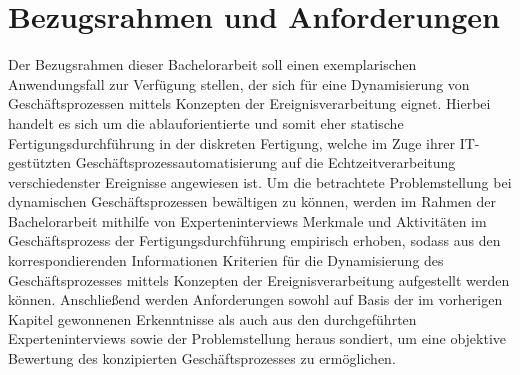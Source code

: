 \chapter{Bezugsrahmen und Anforderungen}\label{ch:Bezugsrahmen}
Der Bezugsrahmen dieser Bachelorarbeit soll einen exemplarischen Anwendungsfall zur Verfügung stellen, der sich für eine Dynamisierung von Geschäftsprozessen mittels Konzepten der Ereignisverarbeitung eignet. Hierbei handelt es sich um die ablauforientierte und somit eher statische Fertigungsdurchführung in der diskreten Fertigung, welche im Zuge ihrer \ac{IT}-gestützten Geschäftsprozessautomatisierung auf die Echtzeitverarbeitung verschiedenster Ereignisse angewiesen ist.
Um die betrachtete Problemstellung bei dynamischen Geschäftsprozessen bewältigen zu können, werden im Rahmen der Bachelorarbeit mithilfe von Experteninterviews Merkmale und Aktivitäten im Geschäftsprozess der Fertigungsdurchführung empirisch erhoben, sodass aus den korrespondierenden Informationen Kriterien für die Dynamisierung des Geschäftsprozesses mittels Konzepten der Ereignisverarbeitung aufgestellt werden können.
Anschließend werden Anforderungen sowohl auf Basis der im vorherigen Kapitel gewonnenen Erkenntnisse als auch aus den durchgeführten Experteninterviews sowie der Problemstellung heraus sondiert, um eine objektive Bewertung des konzipierten Geschäftsprozesses zu ermöglichen.




